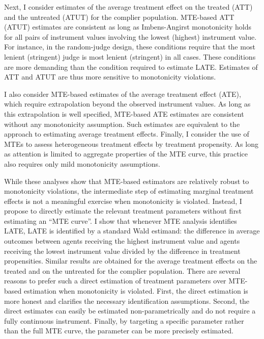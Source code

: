 Next, I consider estimates of the average treatment effect on the
treated (ATT) and the untreated (ATUT) for the complier population.
MTE-based ATT (ATUT) estimates are consistent as long as Imbens-Angirst
monotonicity holds for all pairs of instrument values involving the
lowest (highest) instrument value. For instance, in the random-judge
design, these conditions require that the most lenient (stringent)
judge is most lenient (stringent) in all cases. These conditions are
more demanding than the condition required to estimate LATE. Estimates
of ATT and ATUT are thus more sensitive to monotonicity violations.

I also consider MTE-based estimates of the average treatment effect
(ATE), which require extrapolation beyond the observed instrument
values. As long as this extrapolation is well specified, MTE-based
ATE estimates are consistent without any monotonicity assumption.
Such estimates are equivalent to the \citet{arnold2021measuring}
approach to estimating average treatment effects. Finally, I consider
the use of MTEs to assess heterogeneous treatment effects by treatment
propensity. As long as attention is limited to aggregate properties
of the MTE curve, this practice also requires only mild monotonicity
assumptions.

While these analyses show that MTE-based estimators are relatively
robust to monotonicity violations, the intermediate step of estimating
marginal treatment effects is not a meaningful exercise when monotonicity
is violated. Instead, I propose to directly estimate the relevant
treatment parameters without first estimating an ``MTE curve''.
I show that whenever MTE analysis identifies LATE, LATE is identified
by a standard Wald estimand: the difference in average outcomes between
agents receiving the highest instrument value and agents receiving
the lowest instrument value divided by the difference in treatment
propensities. Similar results are obtained for the average treatment
effects on the treated and on the untreated for the complier population.
There are several reasons to prefer such a direct estimation of treatment
parameters over MTE-based estimation when monotonicity is violated.
First, the direct estimation is more honest and clarifies the necessary
identification assumptions. Second, the direct estimates can easily
be estimated non-parametrically and do not require a fully continuous
instrument. Finally, by targeting a specific parameter rather than
the full MTE curve, the parameter can be more precisely estimated.

